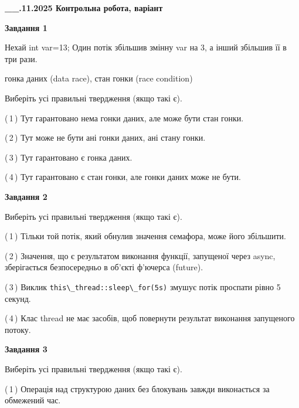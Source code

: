 \documentclass[12pt, ukrainian]{article}
\def\code#1{\Verb!#1!}
\begin{document}
\begin {large}

\textbf{\_\_.11.2025 Контрольна робота, варіант  }\par


{

\begin{center}
\textbf{Завдання 1}
\end{center}
Нехай int var=13; Один потік збільшив змінну var на 3, а інший збільшив її в три рази.

гонка даних (data race), стан гонки (race condition)

Виберіть усі правильні твердження (якщо такі є).\par
\vspace{2mm}
(\,1\,) Тут гарантовано нема гонки даних, але може бути стан гонки.%

(\,2\,) Тут може не бути ані гонки даних, ані стану гонки.%

(\,3\,) Тут гарантовано є гонка даних.%

(\,4\,) Тут гарантовано є стан гонки, але гонки даних може не бути.%



\begin{center}
\textbf{Завдання 2}
\end{center}
Виберіть усі правильні твердження (якщо такі є).\par
\vspace{2mm}

(\,1\,) Тільки той потік, який обнулив значення семафора, може його збільшити.%

(\,2\,) Значення, що є результатом виконання функції, запущеної через async, зберігається безпосередньо в об’єкті ф’ючерса (future).%

(\,3\,) Виклик \code{this\_thread::sleep\_for(5s)} змушує потік проспати рівно 5 секунд.%

(\,4\,) Клас thread не має засобів, щоб повернути результат виконання запущеного потоку.%



\begin{center}
\textbf{Завдання 3}
\end{center}
Виберіть усі правильні твердження (якщо такі є).\par
\vspace{2mm}

(\,1\,) Операція над структурою даних без блокувань завжди виконається за обмежений час.%

}
\end{large}
\end{document}
